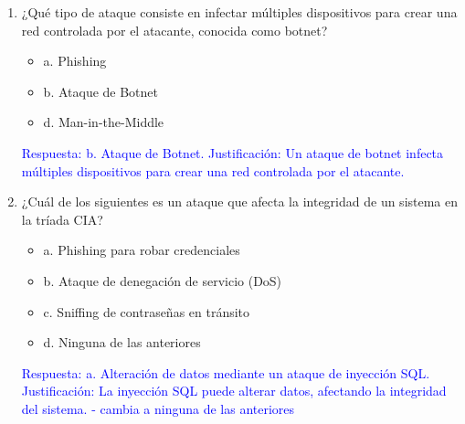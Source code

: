 \documentclass[a4paper]{article}
\begin{document}
\begin{enumerate}
    \item ¿Qué tipo de ataque consiste en infectar múltiples dispositivos para crear una red controlada por el atacante, conocida como botnet?
    \begin{itemize}
        \item a. Phishing
        \item b. Ataque de Botnet
        \item d. Man-in-the-Middle
    \end{itemize}
    \textcolor{blue}{Respuesta: b. Ataque de Botnet. Justificación: Un ataque de botnet infecta múltiples dispositivos para crear una red controlada por el atacante.}
    \vspace{1cm}


    \item ¿Cuál de los siguientes es un ataque que afecta la integridad de un sistema en la tríada CIA?
    \begin{itemize}
        \item a. Phishing para robar credenciales
        \item b. Ataque de denegación de servicio (DoS)
        \item c. Sniffing de contraseñas en tránsito
        \item d. Ninguna de las anteriores %
    \end{itemize}
    \textcolor{blue}{Respuesta: a. Alteración de datos mediante un ataque de inyección SQL. Justificación: La inyección SQL puede alterar datos, afectando la integridad del sistema. - cambia a ninguna de las anteriores}
    \vspace{1cm}


\end{enumerate}
\end{document}
